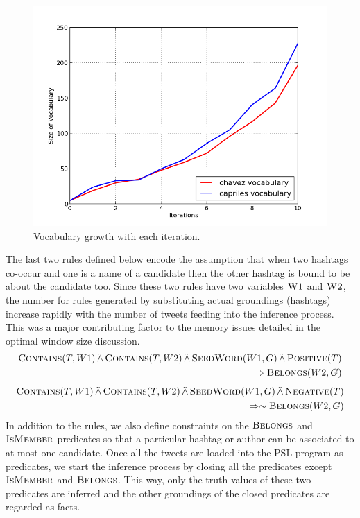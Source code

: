 \begin{figure}
	\centering
	\includegraphics[scale=0.50]{support_files/WordGrowth.png}
	\caption{Vocabulary growth with each iteration.}
	\label{fig:wordgrowth}
\end{figure}

The last two rules defined below encode the assumption that when two hashtags co-occur and one is a name of a candidate then the other hashtag is bound to be about the candidate too.
Since these two rules have two variables $\textsc{W1}$ and $\textsc{W2}$, the number for rules generated by substituting actual groundings (hashtags) increase rapidly with the number of tweets feeding into the inference process. 
This was a major contributing factor to the memory issues detailed in the optimal window size discussion.
\begin{align*}
\begin{split}
\textsc{Contains}(T,W1)
 \softand \textsc{Contains}(T,W2)
  \softand   \textsc{SeedWord}(W1,G)
  \softand \textsc{Positive}(T) \\
	\Rightarrow \textsc{Belongs}(W2,G)
\end{split}
\end{align*}
\begin{align*}
\begin{split}
\textsc{Contains}(T,W1) 
	\softand \textsc{Contains}(T,W2)
	\softand	 \textsc{SeedWord}(W1,G)
	\softand \textsc{Negative}(T)\\
	\Rightarrow \sim \textsc{Belongs}(W2,G)
\end{split}
\end{align*}
In addition to the rules, we also define constraints on the $\textsc{Belongs}$ and $\textsc{IsMember}$ predicates so that a particular hashtag or author can be associated to at most one candidate. 
Once all the tweets are loaded into the PSL program as predicates, we start the inference process by closing all the predicates except $\textsc{IsMember}$ and $\textsc{Belongs}$. 
This way, only the truth values of these two predicates are inferred and the other groundings of the closed predicates are regarded as facts.

